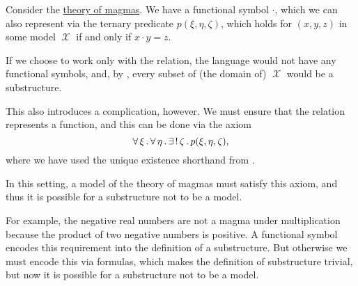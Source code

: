 \begin{example}\label{ex:replacing_functional_symbols_via_relations}
  Consider the \hyperref[def:magma/theory]{theory of magmas}. We have a functional symbol \( \cdot \), which we can also represent via the ternary predicate \( p(\xi, \eta, \zeta) \), which holds for \( (x, y, z) \) in some model \( \mscrX \) if and only if \( x \cdot y = z \).

  If we choose to work only with the relation, the language would not have any functional symbols, and, by , every subset of (the domain of) \( \mscrX \) would be a substructure.

  This also introduces a complication, however. We must ensure that the relation represents a function, and this can be done via the axiom
  \begin{equation*}
    \forall \thinspace \xi \thinspace . \thinspace \forall \thinspace \eta \thinspace . \thinspace \exists \thinspace ! \thinspace \zeta \thinspace . \thinspace p(\xi, \eta, \zeta),
  \end{equation*}
  where we have used the unique existence shorthand from .

  In this setting, a model of the theory of magmas must satisfy this axiom, and thus it is possible for a substructure not to be a model.

  For example, the negative real numbers are not a magma under multiplication because the product of two negative numbers is positive. A functional symbol encodes this requirement into the definition of a substructure. But otherwise we must encode this via formulas, which makes the definition of substructure trivial, but now it is possible for a substructure not to be a model.
\end{example}

